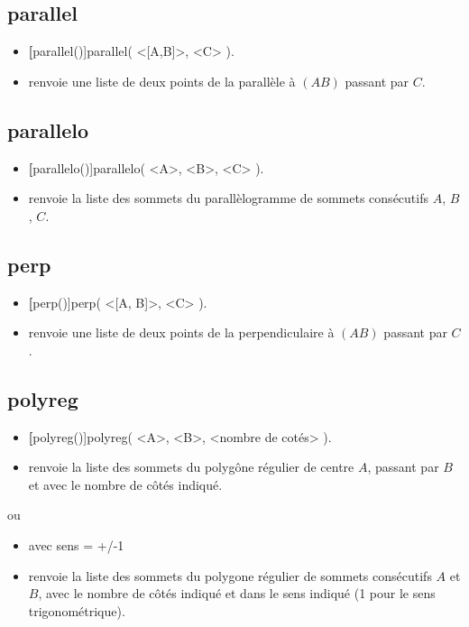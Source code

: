 \subsection{parallel}
\begin{itemize}
 \item \util \textbf[parallel()]{parallel( <[A,B]>, <C> )}.
 \item \desc renvoie une liste de deux points de la parallèle à $(AB)$ passant par $C$.
\end{itemize}


\subsection{parallelo}
\begin{itemize}
 \item \util \textbf[parallelo()]{parallelo( <A>, <B>, <C> )}.
 \item \desc renvoie la liste des sommets du parallèlogramme de sommets consécutifs $A$, $B$, $C$.
\end{itemize}

\subsection{perp}
\begin{itemize}
 \item \util \textbf[perp()]{perp( <[A, B]>, <C> )}.
 \item \desc renvoie une liste de deux points de la perpendiculaire à $(AB)$ passant par $C$.
\end{itemize}


\subsection{polyreg}
\begin{itemize}
 \item \util \textbf[polyreg()]{polyreg( <A>, <B>, <nombre de cotés> )}.
 \item \desc renvoie la liste des sommets du polygône régulier de centre $A$, passant par $B$ et avec le nombre de côtés indiqué.
\end{itemize}

ou

\begin{itemize}
 \item \util {} avec sens = +/-1
 \item \desc renvoie la liste des sommets du polygone régulier de sommets consécutifs $A$ et $B$, avec le nombre de côtés indiqué et dans le sens indiqué (1 pour le sens trigonométrique).
\end{itemize}

